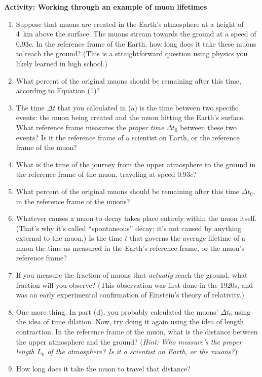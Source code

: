 \bigskip

\textbf{Activity: Working through an example of muon lifetimes} 

\begin{enumerate}[labparts]
\item   
Suppose that muons are created in the Earth's atmosphere at a height of 4~km above the surface.  The muons stream towards the ground at a speed of $0.93c$.
In the reference frame of the Earth, how long does it take these muons to reach the ground?
(This is a straightforward question using physics you likely learned in high school.)
\answerspace{0.9in}

\item What percent of the original muons should be remaining after this time, according to Equation (1)? 
\answerspace{0.7in}

\item The time $\Delta t$ that you calculated in (a) is the time between two specific events: the muon being created and the muon hitting the Earth's surface.  What reference frame measures the \textit{proper time} $\Delta t_0$ between these two events?  Is it the reference frame of a scientist on Earth, or the reference frame of the muon?
\answerspace{0.7in}

\item What is the time of the journey from the upper atmosphere to the ground in the reference frame of the muon, traveling at speed $0.93c$?
\answerspace{0.8in}

\item What percent of the original muons should be remaining after this time $\Delta t_0$, in the reference frame of the muons?
\answerspace{0.6in}

\item Whatever causes a muon to decay takes place entirely within the muon itself.  (That's why it's called ``spontaneous'' decay; it's not caused by anything external to the muon.)  
Is the time $t$ that governs the average lifetime of a muon the time as measured in the Earth's reference frame, or the muon's reference frame?  
\answerspace{0.6in}

\item If you measure the fraction of muons that \textit{actually} reach the ground, what fraction will you observe?
(This observation was first done in the 1920s, and was an early experimental confirmation of Einstein's theory of relativity.)
\answerspace{0.6in}

\item One more thing.  In part (d), you probably calculated the muons' $\Delta t_0$ using the idea of time dilation.  Now, try doing it again using the idea of length contraction.  In the reference frame of the muon, what is the distance between the upper atmosphere and the ground?  (\textit{Hint: Who measure's the proper length $L_0$ of the atmosphere?  Is it a scientist on Earth, or the muons?})
\answerspace{0.8in}

\item How long does it take the muon to travel that distance?
\answerspace{0.6in}

\end{enumerate}

